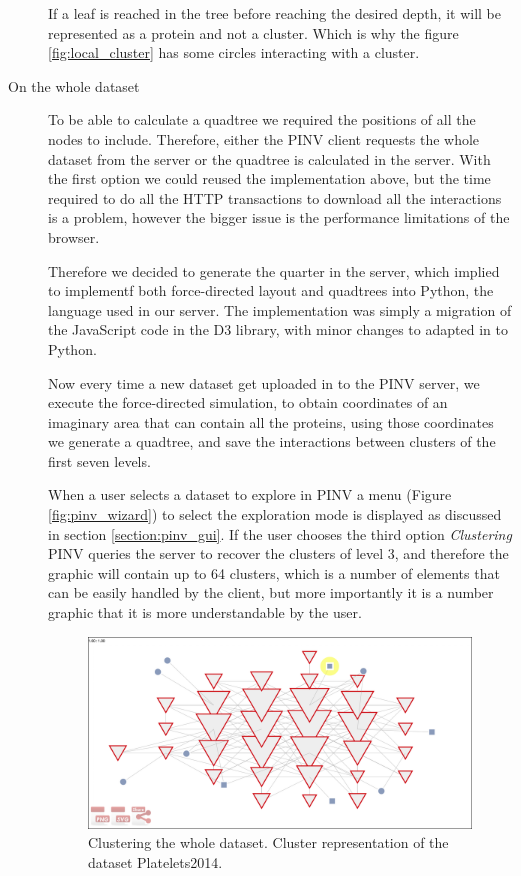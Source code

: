\begin{description}
If a leaf is reached in the tree before reaching the desired depth, it will be represented as a protein and not a cluster. Which is why the figure \ref{fig:local_cluster} has some circles interacting with a cluster.

\item[On the whole dataset]
To be able to calculate a quadtree we required the positions of all the nodes to include. Therefore, either the PINV client requests the whole dataset from the server or the quadtree is calculated in the server. With the first option we could reused the implementation above, but the time required to do all the HTTP transactions to download all the interactions is a problem, however the bigger issue is the performance limitations of the browser.

Therefore we decided to generate the quarter in the server, which implied to implementf both force-directed layout and quadtrees into Python, the language used in our server. The implementation was simply a migration of the JavaScript code in the D3 library, with minor changes to adapted in to Python.

Now every time a new dataset get uploaded in to the PINV server, we execute the force-directed simulation, to obtain coordinates of an imaginary area that can contain all the proteins, using those coordinates we generate a quadtree, and save the interactions between clusters of the first seven levels.

When a user selects a dataset to explore in PINV a menu (Figure \ref{fig:pinv_wizard}) to select the exploration mode is displayed as discussed in section \ref{section:pinv_gui}. If the user chooses the third option \emph{Clustering} PINV queries the server to recover the clusters of level 3, and therefore the graphic will contain up to 64 clusters, which is a number of elements that can be easily handled by the client, but more importantly it is a number graphic that it is more understandable by the user.

\begin{figure}[ht]
\centering
\includegraphics[width=\textwidth]{figures/dataset_cluster.png}
\caption[Clustering the whole dataset.]{Clustering the whole dataset. Cluster representation of the dataset Platelets2014.
\label{fig:dataset_cluster}}
\end{figure}


\end{description}
